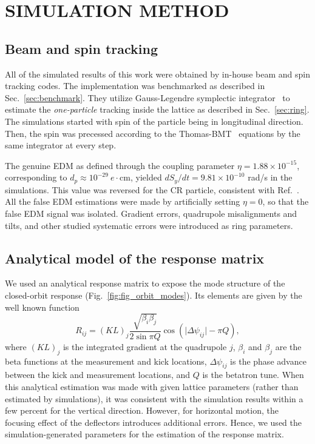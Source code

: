 \documentclass[aps,prab,reprint,superscriptaddress,nofootinbib]{revtex4-2}
\begin{document}
	\section{SIMULATION METHOD}
	\label{sec:simulation}
	\subsection{Beam and spin tracking}
	\label{sec:tracking}
	All of the simulated results of this work were obtained by in-house beam and spin tracking codes. The implementation was benchmarked as described in Sec.~\ref{sec:benchmark}. They utilize Gauss-Legendre symplectic integrator~\cite{hairer} to estimate the \textit{one-particle} tracking inside the lattice as described in Sec.~\ref{sec:ring}. The simulations started with spin of the particle being in longitudinal direction. Then, the spin was precessed according to the Thomas-BMT~\cite{bmt1959} equations by the same integrator at every step.

	The genuine EDM as defined through the coupling parameter $\eta = 1.88 \times 10^{-15}$, corresponding to $d_p\approx 10^{-29}~e\cdot$cm, yielded $dS_y/dt = 9.81 \times 10^{-10}$ rad/s in the simulations. This value was reversed for the CR particle, consistent with Ref.~\cite{omarov}. All the false EDM estimations were made by artificially setting $\eta=0$, so that the false EDM signal was isolated. Gradient errors, quadrupole misalignments and tilts, and other studied systematic errors were introduced as ring parameters.

	\subsection{Analytical model of the response matrix}
	\label{sec:respmodel}
	We used an analytical response matrix to expose the mode structure of the closed-orbit response (Fig.~\ref{fig:fig_orbit_modes}). Its elements are given by the well known function
	\begin{equation}
		R_{ij} =  (KL)_j \frac{\sqrt{\beta_i \beta_j}}{2 \sin \pi Q}\cos(\vert \Delta \psi_{ij} \vert - \pi Q),
		\label{Eq:response_matrix}
	\end{equation}
	where $(KL)_j$ is the integrated gradient at the quadrupole $j$, $\beta_i$ and $\beta_j$ are the beta functions at the measurement and kick locations, $\Delta \psi_{ij}$ is the phase advance between the kick and measurement locations, and $Q$ is the betatron tune. When this analytical estimation was made with given lattice parameters (rather than estimated by simulations), it was consistent with the simulation results within a few percent for the vertical direction. However, for horizontal motion, the focusing effect of the deflectors introduces additional errors. Hence, we used the simulation-generated parameters for the estimation of the response matrix.
\end{document}

